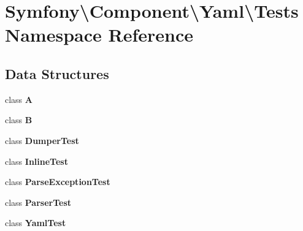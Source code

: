 \section{Symfony\textbackslash{}Component\textbackslash{}Yaml\textbackslash{}Tests Namespace Reference}
\label{namespace_symfony_1_1_component_1_1_yaml_1_1_tests}
\subsection*{Data Structures}
\begin{DoxyCompactItemize}
\item 
class {\bf A}
\item 
class {\bf B}
\item 
class {\bf Dumper\+Test}
\item 
class {\bf Inline\+Test}
\item 
class {\bf Parse\+Exception\+Test}
\item 
class {\bf Parser\+Test}
\item 
class {\bf Yaml\+Test}
\end{DoxyCompactItemize}
